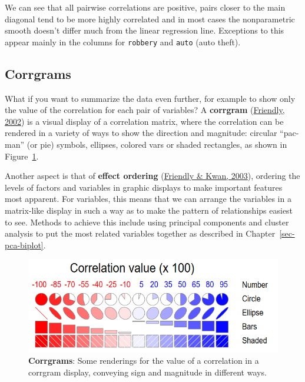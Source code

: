 \documentclass[
  letterpaper,
  10pt,
  krantz2]{krantz}
\begin{document}
We can see that all pairwise correlations are positive, pairs closer to
the main diagonal tend to be more highly correlated and in most cases
the nonparametric smooth doesn't differ much from the linear regression
line. Exceptions to this appear mainly in the columns for
\texttt{robbery} and \texttt{auto} (auto theft).

\hypertarget{sec-corrgram}{%
\subsection{Corrgrams}\label{sec-corrgram}}

What if you want to summarize the data even further, for example to show
only the value of the correlation for each pair of variables? A
\textbf{corrgram}
(\protect\hyperlink{ref-Friendly:02:corrgram}{Friendly, 2002}) is a
visual display of a correlation matrix, where the correlation can be
rendered in a variety of ways to show the direction and magnitude:
circular ``pac-man'' (or pie) symbols, ellipses, colored vars or shaded
rectangles, as shown in Figure~\ref{fig-corrgram-renderings}.

Another aspect is that of \textbf{effect ordering}
(\protect\hyperlink{ref-FriendlyKwan:03:effect}{Friendly \& Kwan,
2003}), ordering the levels of factors and variables in graphic displays
to make important features most apparent. For variables, this means that
we can arrange the variables in a matrix-like display in such a way as
to make the pattern of relationships easiest to see. Methods to achieve
this include using principal components and cluster analysis to put the
most related variables together as described in
Chapter~\ref{sec-pca-biplot}.

\begin{figure}

{\centering \includegraphics[width=1\textwidth,height=\textheight]{images/corrgram-renderings.png}

}

\caption{\label{fig-corrgram-renderings}\textbf{Corrgrams}: Some
renderings for the value of a correlation in a corrgram display,
conveying sign and magnitude in different ways.}

\end{figure}
\end{document}
